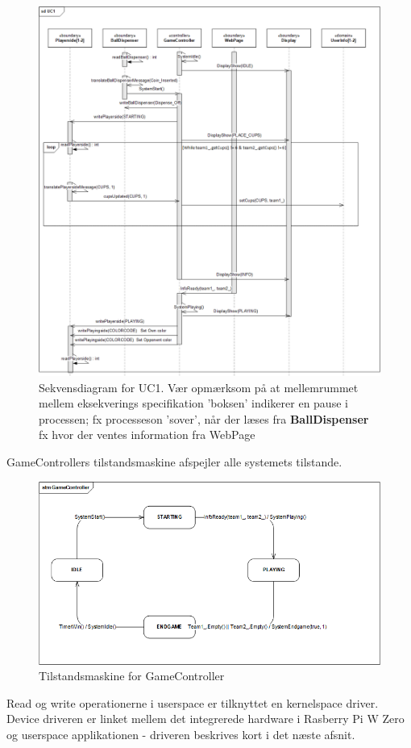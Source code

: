 \documentclass[Rapport/Rapport_main.tex]{subfiles}
\begin{document}
\begin{figure}[H]
    \centering
    \includegraphics[width=\textwidth]{Arkitektur/Softwarearkitektur/Applikationsmodel/RPi/graphics_RPi/UC1_SD.png}
    \caption{Sekvensdiagram for UC1. Vær opmærksom på at mellemrummet mellem eksekverings specifikation 'boksen' indikerer en pause i processen; fx processeson 'sover', når der læses fra \textbf{BallDispenser} fx hvor der ventes information fra WebPage}
    \label{fig:UC1_SD_RPi_RAP}
\end{figure}
GameControllers tilstandsmaskine afspejler alle systemets tilstande. 
\begin{figure}[H]
    \centering
    \includegraphics[width=\textwidth]{Rapport/Arkitektur/graphics/GAME_STATE.png}
    \caption{Tilstandsmaskine for GameController}
    \label{fig:STM_GAME}
\end{figure}
Read og write operationerne i userspace er tilknyttet en kernelspace driver. Device driveren er linket mellem det integrerede hardware i Rasberry Pi W Zero og userspace applikationen - driveren beskrives kort i det næste afsnit. 
\end{document}
